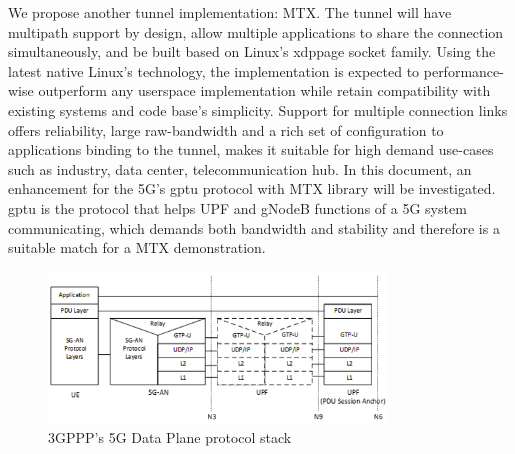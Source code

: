 We propose another tunnel implementation: \ac{MTX}. 
The tunnel will have multipath support by design, allow multiple applications to share the connection simultaneously, and be built based on Linux's \ac{xdppage} socket family.
Using the latest native Linux's technology, the implementation is expected to performance-wise outperform any userspace implementation while retain compatibility with existing systems and code base's simplicity. 
Support for multiple connection links offers reliability, large raw-bandwidth and a rich set of configuration to applications binding to the tunnel, makes it suitable for high demand use-cases such as industry, data center, telecommunication hub. 
In this document, an enhancement for the 5G's \ac{gptu} protocol  with \ac{MTX} library will be investigated. \ac{gptu} is the protocol that helps UPF and gNodeB functions of a 5G system communicating, which demands both bandwidth and stability and therefore is a suitable match for a \ac{MTX} demonstration.

\begin{figure}[H]
	\centering
	\includegraphics[width=0.8\textwidth]{resources/images/3gpp_5g_data_plane_protocol.png}
	\caption{3GPPP's 5G Data Plane protocol stack \cite{3gpp_5g_system_overview}}
    \label{fig:introduction:3gpp_5g_data_plane_protocol}
\end{figure}



